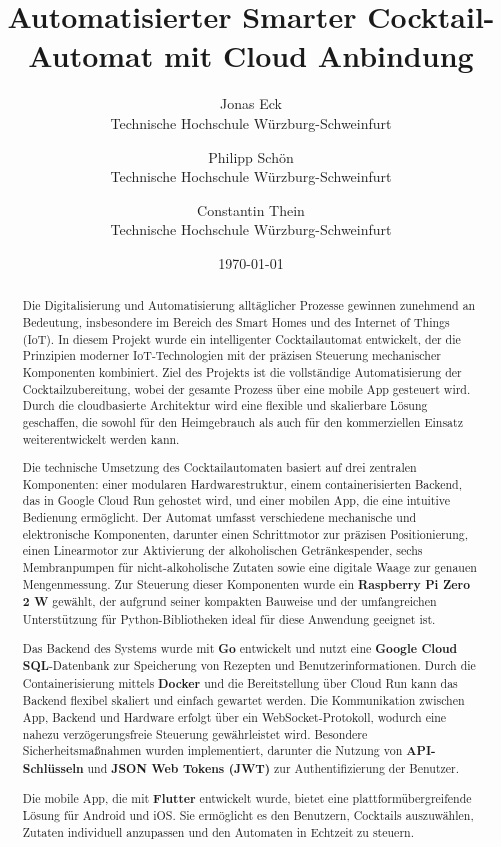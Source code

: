 \documentclass[a4paper, 10pt]{article} %
\title{Automatisierter Smarter Cocktail-Automat mit Cloud Anbindung}
\author{ 
  Jonas Eck \\
	Technische Hochschule Würzburg-Schweinfurt\\
	\and 
	Philipp Schön \\
	Technische Hochschule Würzburg-Schweinfurt\\
	\and 
  Constantin Thein\\
	Technische Hochschule Würzburg-Schweinfurt\\
	}
\date{\today}
\begin{document}
\maketitle
\newpage
\tableofcontents
\newpage

\begin{abstract}
	\normalsize
Die Digitalisierung und Automatisierung alltäglicher Prozesse gewinnen zunehmend an Bedeutung, insbesondere im Bereich des Smart Homes und des Internet of Things (IoT). In diesem Projekt wurde ein intelligenter Cocktailautomat entwickelt, der die Prinzipien moderner IoT-Technologien mit der präzisen Steuerung mechanischer Komponenten kombiniert. Ziel des Projekts ist die vollständige Automatisierung der Cocktailzubereitung, wobei der gesamte Prozess über eine mobile App gesteuert wird. Durch die cloudbasierte Architektur wird eine flexible und skalierbare Lösung geschaffen, die sowohl für den Heimgebrauch als auch für den kommerziellen Einsatz weiterentwickelt werden kann.

Die technische Umsetzung des Cocktailautomaten basiert auf drei zentralen Komponenten: einer modularen Hardwarestruktur, einem containerisierten Backend, das in Google Cloud Run gehostet wird, und einer mobilen App, die eine intuitive Bedienung ermöglicht. Der Automat umfasst verschiedene mechanische und elektronische Komponenten, darunter einen Schrittmotor zur präzisen Positionierung, einen Linearmotor zur Aktivierung der alkoholischen Getränkespender, sechs Membranpumpen für nicht-alkoholische Zutaten sowie eine digitale Waage zur genauen Mengenmessung. Zur Steuerung dieser Komponenten wurde ein \textbf{Raspberry Pi Zero 2 W} gewählt, der aufgrund seiner kompakten Bauweise und der umfangreichen Unterstützung für Python-Bibliotheken ideal für diese Anwendung geeignet ist.

Das Backend des Systems wurde mit \textbf{Go} entwickelt und nutzt eine \textbf{Google Cloud SQL}-Datenbank zur Speicherung von Rezepten und Benutzerinformationen. Durch die Containerisierung mittels \textbf{Docker} und die Bereitstellung über Cloud Run kann das Backend flexibel skaliert und einfach gewartet werden. Die Kommunikation zwischen App, Backend und Hardware erfolgt über ein WebSocket-Protokoll, wodurch eine nahezu verzögerungsfreie Steuerung gewährleistet wird. Besondere Sicherheitsmaßnahmen wurden implementiert, darunter die Nutzung von \textbf{API-Schlüsseln} und \textbf{JSON Web Tokens (JWT)} zur Authentifizierung der Benutzer.

Die mobile App, die mit \textbf{Flutter} entwickelt wurde, bietet eine plattformübergreifende Lösung für Android und iOS. Sie ermöglicht es den Benutzern, Cocktails auszuwählen, Zutaten individuell anzupassen und den Automaten in Echtzeit zu steuern.


\end{abstract}
\end{document}
